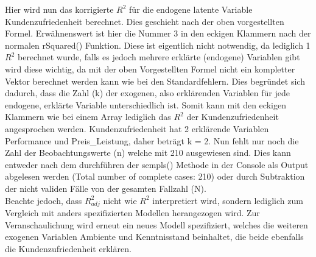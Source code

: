 \documentclass{article}\usepackage[]{graphicx}\usepackage[]{color}
\begin{document}
Hier wird nun das korrigierte $R^{2}$ für die endogene latente Variable Kundenzufriedenheit berechnet. Dies geschieht nach der oben vorgestellten Formel. Erwähnenswert ist hier die Nummer 3 in den eckigen Klammern nach der normalen rSquared() Funktion. Diese ist eigentlich nicht notwendig, da lediglich 1 $R^{2}$ berechnet wurde, falls es jedoch mehrere erklärte (endogene) Variablen gibt wird diese wichtig, da mit der oben Vorgestellten Formel nicht ein kompletter Vektor berechnet werden kann wie bei den Standardfehlern. Dies begründet sich dadurch, dass die Zahl (k) der exogenen, also erklärenden Variablen für jede endogene, erklärte Variable unterschiedlich ist. Somit kann mit den eckigen Klammern wie bei einem Array lediglich das $R^{2}$ der Kundenzufriedenheit angesprochen werden. Kundenzufriedenheit hat 2 erklärende Variablen Performance und Preis\_Leistung, daher beträgt k = 2. Nun fehlt nur noch die Zahl der Beobachtungswerte (n) welche mit 210 ausgewiesen sind. Dies kann entweder nach dem durchführen der sempls() Methode in der Console als Output abgelesen werden (Total number of complete cases: 210) oder durch Subtraktion der nicht validen Fälle von der gesamten Fallzahl (N).\\
Beachte jedoch, dass $R^{2}_{adj}$ nicht wie $R^{2}$ interpretiert wird, sondern lediglich zum Vergleich mit anders spezifizierten Modellen herangezogen wird. Zur Veranschaulichung wird erneut ein neues Modell spezifiziert, welches die weiteren exogenen Variablen Ambiente und Kenntnisstand beinhaltet, die beide ebenfalls die Kundenzufriedenheit erklären.
\end{document}
